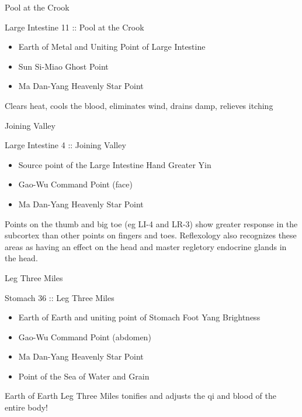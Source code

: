\begin{frame}{Pool at the Crook}

\large{Large Intestine 11 :: Pool at the Crook}

\begin{itemize}
\item Earth of Metal and Uniting Point of Large Intestine
\item Sun Si-Miao Ghost Point
\item Ma Dan-Yang Heavenly Star Point
\end{itemize}

\vspace{1em}

Clears heat, cools the blood, eliminates wind, drains damp, relieves itching

\end{frame}

\begin{frame}{Joining Valley}

\large{Large Intestine 4 :: Joining Valley}

\begin{itemize}
\item Source point of the Large Intestine Hand Greater Yin
\item Gao-Wu Command Point (face)
\item Ma Dan-Yang Heavenly Star Point
\end{itemize}

\vspace{1em}

Points on the thumb and big toe (eg LI-4 and LR-3) show greater response in the subcortex than other points on fingers and toes. Reflexology also recognizes these areas as having an effect on the head and master regletory endocrine glands in the head. 

\end{frame}


\begin{frame}{Leg Three Miles}

\large{Stomach 36 :: Leg Three Miles}

\begin{itemize}
\item Earth of Earth and uniting point of Stomach Foot Yang Brightness
\item Gao-Wu Command Point (abdomen)
\item Ma Dan-Yang Heavenly Star Point
\item Point of the Sea of Water and Grain
\end{itemize}

\vspace{1em}

Earth of Earth Leg Three Miles tonifies and adjusts the qi and blood of the entire body!

\end{frame}

